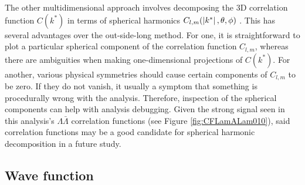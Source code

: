The other multidimensional approach involves decomposing the 3D correlation function $C(k^*)$ in terms of spherical harmonics $C_{l,m}(\left\lvert k^*\right\rvert,\theta, \phi)$ \cite{Chajecki:2008vg}.
This has several advantages over the out-side-long method.
For one, it is straightforward to plot a particular spherical component of the correlation function $C_{l,m}$, whereas there are ambiguities when making one-dimensional projections of $C(k^*)$.
For another, various physical symmetries should cause certain components of $C_{l,m}$ to be zero.
If they do not vanish, it usually a symptom that something is procedurally wrong with the analysis.
Therefore, inspection of the spherical components can help with analysis debugging.
Given the strong signal seen in this analysis's $\Lambda\bar{\Lambda}$ correlation functions (see Figure \ref{fig:CFLamALam010}), said correlation functions may be a good candidate for spherical harmonic decomposition in a future study.




 
\subsection{Wave function}
\label{sec:WaveFunction}

